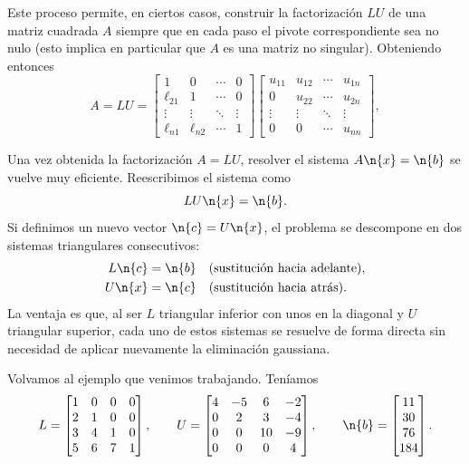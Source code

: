 Este proceso permite, en ciertos casos, construir la factorización $LU$ de una matriz cuadrada $A$ siempre que en cada paso el pivote correspondiente sea no nulo (esto implica en particular que $A$ es una matriz no singular). Obteniendo entonces
\[
A = L U =
\begin{bmatrix}
1 & 0 & \cdots & 0 \\
\ell_{21} & 1 & \cdots & 0 \\
\vdots & \vdots & \ddots & \vdots \\
\ell_{n1} & \ell_{n2} & \cdots & 1
\end{bmatrix}
\begin{bmatrix}
u_{11} & u_{12} & \cdots & u_{1n} \\
0 & u_{22} & \cdots & u_{2n} \\
\vdots & \vdots & \ddots & \vdots \\
0 & 0 & \cdots & u_{nn}
\end{bmatrix},
\]

Una vez obtenida la factorización $A = LU$, resolver el sistema $A\n{x} = \n{b}$ se vuelve muy eficiente. Reescribimos el sistema como
\[
LU\n{x} = \n{b}.
\]
Si definimos un nuevo vector $\n{c} = U\n{x}$, el problema se descompone en dos sistemas triangulares consecutivos:
\begin{align*}
L\n{c} &= \n{b} \quad \text{(sustitución hacia adelante)}, \\
U\n{x} &= \n{c} \quad \text{(sustitución hacia atrás)}.
\end{align*}
La ventaja es que, al ser $L$ triangular inferior con unos en la diagonal y $U$ triangular superior, cada uno de estos sistemas se resuelve de forma directa sin necesidad de aplicar nuevamente la eliminación gaussiana.

Volvamos al ejemplo que venimos trabajando. Teníamos
\[
L = \begin{bmatrix}
1 & 0 & 0 & 0 \\
2 & 1 & 0 & 0 \\
3 & 4 & 1 & 0 \\
5 & 6 & 7 & 1
\end{bmatrix}, \qquad
U = \begin{bmatrix}
4 & -5 & 6 & -2 \\
0 & 2 & 3 & -4 \\
0 & 0 & 10 & -9 \\
0 & 0 & 0 & 4
\end{bmatrix}, \qquad
\n{b} = \begin{bmatrix} 11 \\ 30 \\ 76 \\ 184 \end{bmatrix}.
\]


